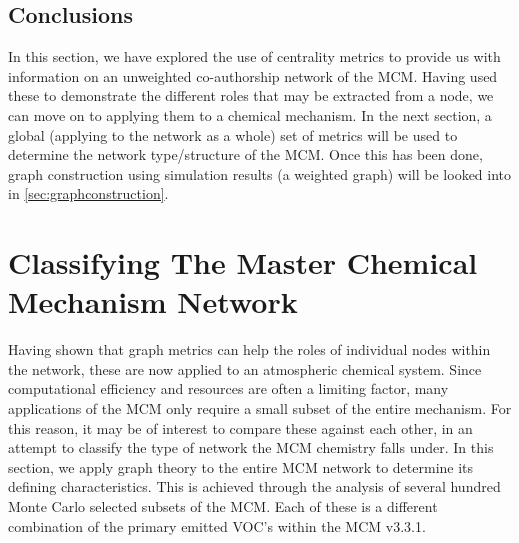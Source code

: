 \subsection{Conclusions}
In this section, we have explored the use of centrality metrics to provide us with information on an unweighted co-authorship network of the MCM. Having used these to demonstrate the different roles that may be extracted from a node, we can move on to applying them to a chemical mechanism. In the next section, a global (applying to the network as a whole) set of metrics will be used to determine the network type/structure of the MCM. Once this has been done, graph construction using simulation results (a weighted graph) will be looked into in \autoref{sec:graphconstruction}.
%
%


\section{Classifying The Master Chemical Mechanism Network}\label{sec:globalclass}

Having shown that graph metrics can help the roles of individual nodes within the network, these are now applied to an atmospheric chemical system. Since computational efficiency and resources are often a limiting factor, many applications of the MCM only require a small subset of the entire mechanism. For this reason, it may be of interest to compare these against each other, in an attempt to classify the type of network the MCM chemistry falls under. In this section, we apply graph theory to the entire MCM network to determine its defining characteristics. This is achieved through the analysis of several hundred Monte Carlo selected subsets of the MCM. Each of these is a different combination of the primary emitted VOC's within the MCM v3.3.1.

